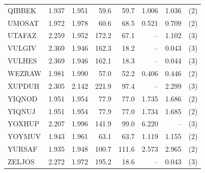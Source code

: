 \begin{table}[htbp]
\begin{tabular}{lrrrrrrc}
QIBBEK & 1.937 & 1.951 & 59.6 & 59.7 & 1.006 & 1.036 & (2) \\
UMOSAT & 1.972 & 1.978 & 60.6 & 68.5 & 0.521 & 0.709 & (2) \\
UTAFAZ & 2.259 & 1.952 & 172.2 & 67.1 & -- & 1.102 & (3) \\
VULGIV & 2.369 & 1.946 & 162.3 & 18.2 & -- & 0.043 & (3) \\
VULHES & 2.369 & 1.946 & 162.1 & 18.3 & -- & 0.044 & (3) \\
WEZRAW & 1.981 & 1.990 & 57.0 & 52.2 & 0.406 & 0.446 & (2) \\
XUPDUH & 2.305 & 2.142 & 221.9 & 97.4 & -- & 2.299 & (3) \\
YIQNOD & 1.951 & 1.954 & 77.9 & 77.0 & 1.735 & 1.686 & (2) \\
YIQNUJ & 1.951 & 1.954 & 77.9 & 77.0 & 1.734 & 1.685 & (2) \\
YOXHUP & 2.207 & 1.996 & 141.9 & 99.0 & 6.220 & -- & (3) \\
YOYMUV & 1.943 & 1.961 & 63.1 & 63.7 & 1.119 & 1.155 & (2) \\
YURSAF & 1.935 & 1.948 & 100.7 & 111.6 & 2.573 & 2.965 & (2) \\
ZELJOS & 2.272 & 1.972 & 195.2 & 18.6 & -- & 0.043 & (3) \\
\hline
\end{tabular}
\end{table}

